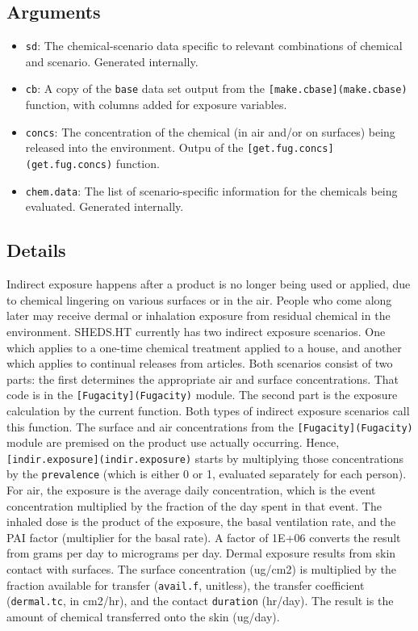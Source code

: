 \documentclass[
]{article}
\providecommand{\tightlist}{%
  \setlength{\itemsep}{0pt}\setlength{\parskip}{0pt}}
\begin{document}
\hypertarget{arguments-24}{%
\subsection{Arguments}\label{arguments-24}}

\begin{itemize}
\tightlist
\item
  \texttt{sd}: The chemical-scenario data specific to relevant
  combinations of chemical and scenario. Generated internally.
\item
  \texttt{cb}: A copy of the \texttt{base} data set output from the
  \texttt{{[}make.cbase{]}(make.cbase)} function, with columns added for
  exposure variables.
\item
  \texttt{concs}: The concentration of the chemical (in air and/or on
  surfaces) being released into the environment. Outpu of the
  \texttt{{[}get.fug.concs{]}(get.fug.concs)} function.
\item
  \texttt{chem.data}: The list of scenario-specific information for the
  chemicals being evaluated. Generated internally.
\end{itemize}

\hypertarget{details-19}{%
\subsection{Details}\label{details-19}}

Indirect exposure happens after a product is no longer being used or
applied, due to chemical lingering on various surfaces or in the air.
People who come along later may receive dermal or inhalation exposure
from residual chemical in the environment. SHEDS.HT currently has two
indirect exposure scenarios. One which applies to a one-time chemical
treatment applied to a house, and another which applies to continual
releases from articles. Both scenarios consist of two parts: the first
determines the appropriate air and surface concentrations. That code is
in the \texttt{{[}Fugacity{]}(Fugacity)} module. The second part is the
exposure calculation by the current function. Both types of indirect
exposure scenarios call this function. The surface and air
concentrations from the \texttt{{[}Fugacity{]}(Fugacity)} module are
premised on the product use actually occurring. Hence,
\texttt{{[}indir.exposure{]}(indir.exposure)} starts by multiplying
those concentrations by the \texttt{prevalence} (which is either 0 or 1,
evaluated separately for each person). For air, the exposure is the
average daily concentration, which is the event concentration multiplied
by the fraction of the day spent in that event. The inhaled dose is the
product of the exposure, the basal ventilation rate, and the PAI factor
(multiplier for the basal rate). A factor of 1E+06 converts the result
from grams per day to micrograms per day. Dermal exposure results from
skin contact with surfaces. The surface concentration (ug/cm2) is
multiplied by the fraction available for transfer (\texttt{avail.f},
unitless), the transfer coefficient (\texttt{dermal.tc}, in cm2/hr), and
the contact \texttt{duration} (hr/day). The result is the amount of
chemical transferred onto the skin (ug/day).
\end{document}
